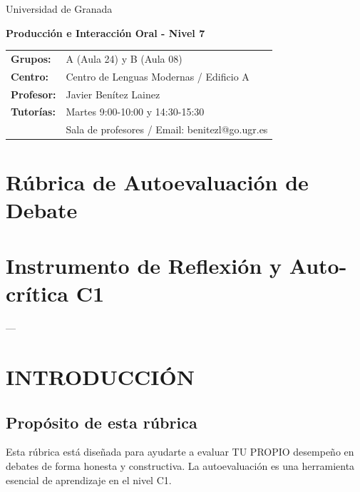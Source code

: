\documentclass[a4paper,11pt]{article}
\begin{document}
\begin{center}
\small{Universidad de Granada}

\vspace{0.3cm}

\textbf{\large{Producción e Interacción Oral - Nivel 7}}

\vspace{0.4cm}

\small
\begin{tabular}{@{}ll@{}}
\textbf{Grupos:} & A (Aula 24) y B (Aula 08) \\
\textbf{Centro:} & Centro de Lenguas Modernas / Edificio A \\
\textbf{Profesor:} & Javier Benítez Lainez \\
\textbf{Tutorías:} & Martes 9:00-10:00 y 14:30-15:30 \\
& Sala de profesores / Email: benitezl@go.ugr.es
\end{tabular}
\end{center}

\vspace{0.5cm}
\section*{Rúbrica de Autoevaluación de Debate}

\vspace{0.4cm}

\section{Instrumento de Reflexión y Auto-crítica C1}

\vspace{0.2cm}

---

\vspace{0.2cm}

\section{INTRODUCCIÓN}

\vspace{0.2cm}

\subsection{Propósito de esta rúbrica}

Esta rúbrica está diseñada para ayudarte a evaluar TU PROPIO desempeño en debates de forma honesta y constructiva. La autoevaluación es una herramienta esencial de aprendizaje en el nivel C1.
\end{document}
